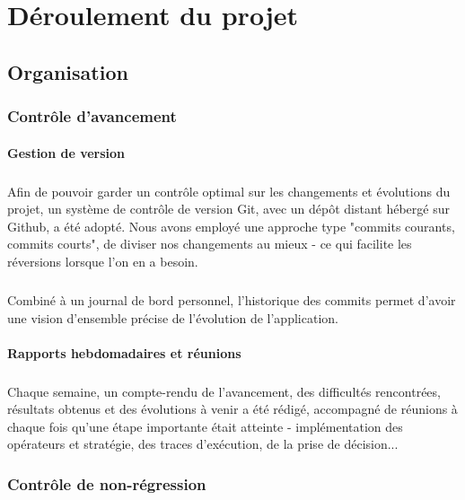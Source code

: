 \documentclass[a4paper,10pt]{report}
\begin{document}
\chapter{Déroulement du projet}
\section{Organisation}
\subsection{Contrôle d'avancement}

\subsubsection{Gestion de version}%
\paragraph{}
  Afin de pouvoir garder un contrôle optimal sur les changements et évolutions
du projet, un système de contrôle de version Git, avec un dépôt distant hébergé
sur Github, a été adopté. Nous avons employé une approche type "commits
courants, commits courts", de diviser nos changements au mieux - ce qui facilite
les réversions lorsque l'on en a besoin.

\paragraph{}
  Combiné à un journal de bord personnel, l'historique des commits permet
d'avoir une vision d'ensemble précise de l'évolution de l'application.

\subsubsection{Rapports hebdomadaires et réunions}
\paragraph{}
  Chaque semaine, un compte-rendu de l'avancement, des difficultés rencontrées,
résultats obtenus et des évolutions à venir a été rédigé, accompagné de
réunions à chaque fois qu'une étape importante était atteinte - implémentation
des opérateurs et stratégie, des traces d'exécution, de la prise de décision...


\subsection{Contrôle de non-régression}
\end{document}
